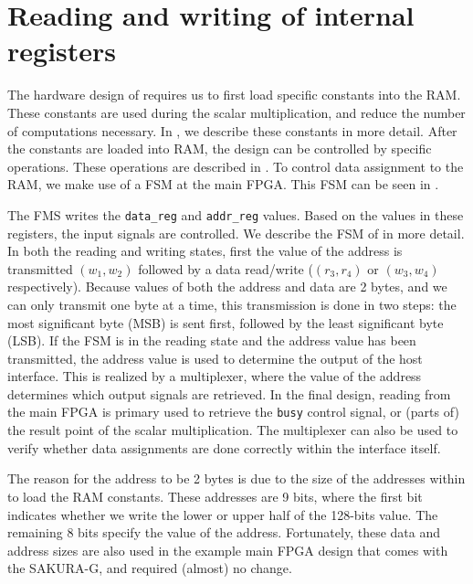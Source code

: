 \section{Reading and writing of internal registers}
The hardware design of {\fourq} requires us to first load specific constants into the RAM.
These constants are used during the scalar multiplication, and reduce the number of computations necessary.
In , we describe these constants in more detail.
After the constants are loaded into RAM, the design can be controlled by specific operations.
These operations are described in .
To control data assignment to the RAM, we make use of a FSM at the main FPGA.
This FSM can be seen in .
%
\begin{figure}
	\centering
	
	\label{fig: host fsm}
\end{figure}
%
The FMS writes the \texttt{data_reg} and \texttt{addr_reg} values. 
Based on the values in these registers, the {\fourq} input signals are controlled.
We describe the FSM of  in more detail.
In both the reading and writing states, first the value of the address is transmitted  $(w_1, w_2)$ followed by a data read/write ($(r_3, r_4)$ or $(w_3, w_4)$ respectively).
Because values of both the address and data are 2 bytes, and we can only transmit one byte at a time, this transmission is done in two steps: the most significant byte (MSB) is sent first, followed by the least significant byte (LSB).
If the FSM is in the reading state and the address value has been transmitted, the address value is used to determine the output of the host interface.
This is realized by a multiplexer, where the value of the address determines which output signals are retrieved.
In the final design, reading from the main FPGA is primary used to retrieve the \texttt{busy} control signal, or (parts of) the result point of the scalar multiplication. 
The multiplexer can also be used to verify whether data assignments are done correctly within the interface itself.

The reason for the address to be 2 bytes is due to the size of the addresses within {\fourq} to load the RAM constants.
These addresses are 9 bits, where the first bit indicates whether we write the lower or upper half of the 128-bits value.
The remaining 8 bits specify the value of the address.
Fortunately, these data and address sizes are also used in the example main FPGA design that comes with the SAKURA-G, and required (almost) no change.

